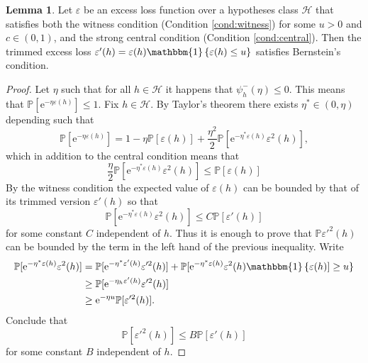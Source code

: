 \documentclass{uvamath}
\newcommand*{\calH}{\mathcal{H}}
\newcommand*{\bbP}{\mathbb{P}}
\newcommand*{\indicator}[1]{\mathbbm{1}\left\{#1\right\}}
\newcommand*{\rme}{\mathrm{e}}
\theoremstyle{remark}
\theoremstyle{definition}
\theoremstyle{definition}
\theoremstyle{definition}
\theoremstyle{definition}
\newtheorem{lemma}[theorem]{Lemma}
\theoremstyle{definition}
\begin{document}
\begin{lemma}
  Let $\varepsilon$ be an excess loss function over a hypotheses class
  $\calH$ that satisfies both the witness condition (Condition
  \ref{cond:witness}) for some $u>0$ and $c\in(0,1)$, and the strong
  central condition (Condition \ref{cond:central}). Then the trimmed
  excess loss
  $\varepsilon'(h) = \varepsilon(h)\indicator{\varepsilon(h)\leq u}$
  satisfies Bernstein's condition.
\end{lemma}
\begin{proof}
  Let $\eta$ such that for all $h\in\calH$ it happens that
  $\psi_h^-(\eta)\leq 0$. This means that
  $\bbP[\rme^{-\eta\varepsilon(h)}]\leq 1$. Fix $h\in\calH$. By Taylor's
  theorem there exists $\eta^*\in(0,\eta)$ depending such that
  \begin{equation*}
    \bbP[\rme^{-\eta\varepsilon(h)}] = 1 - \eta\bbP[\varepsilon(h)] +
    \frac{\eta^ 2}{2}\bbP[\rme^{-\eta^*\varepsilon(h)}\varepsilon^2(h)],
  \end{equation*}
  which in addition to the central condition means that
  \begin{equation*}
    \frac{\eta}{2}\bbP[\rme^{-\eta^*\varepsilon(h)}\varepsilon^2(h)]
    \leq \bbP[\varepsilon(h)]
  \end{equation*}
  By the witness condition the expected value of $\varepsilon(h)$ can
  be bounded by that of its trimmed version $\varepsilon'(h)$ so that
  \begin{equation*}
    \bbP[\rme^{-\eta^*\varepsilon(h)}\varepsilon^2(h)] \leq C\bbP[\varepsilon'(h)]
  \end{equation*}
  for some constant $C$ independent of $h$. Thus it is enough to prove
  that $\bbP\varepsilon'^ 2(h)$ can be bounded by the term in the left
  hand of the previous inequality. Write
  \begin{align*}
    \bbP[\rme^{-\eta^*\varepsilon(h)}\varepsilon^2(h) ]
    &=
      \bbP[\rme^{-\eta^*\varepsilon'(h)}\varepsilon'^2(h)] +
      \bbP[\rme^{-\eta^*\varepsilon(h)}\varepsilon^2(h)\indicator{\varepsilon(h)]\geq
      u}\\
    &\geq \bbP[\rme^{-\eta_h\varepsilon'(h)}\varepsilon'^2(h)]\\
    &\geq \rme^{-\eta u}\bbP[\varepsilon'^2(h)].
  \end{align*}
  Conclude that
  \begin{equation*}
    \bbP[\varepsilon'^2(h)] \leq B \bbP[\varepsilon'(h)]
  \end{equation*}
  for some constant $B$ independent of $h$.
\end{proof}
\end{document}
